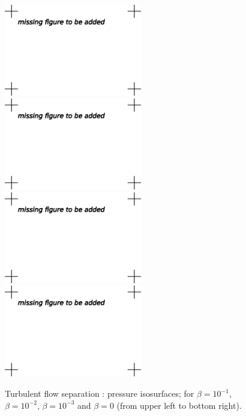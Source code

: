 \begin{figure}
\centering
\includegraphics[height=4cm]{chapters/hoffman-1/eps/Hoffman_fig3a.eps}
\includegraphics[height=4cm]{chapters/hoffman-1/eps/Hoffman_fig3b.eps}
\includegraphics[height=4cm]{chapters/hoffman-1/eps/Hoffman_fig3c.eps}
\includegraphics[height=4cm]{chapters/hoffman-1/eps/Hoffman_fig3d.eps}
\caption{Turbulent flow separation \cite{JanssonHoffman2009}: pressure isosurfaces; for $\beta = 10^{-1}$, $\beta = 10^{-2}$, $\beta = 10^{-3}$ and $\beta = 0$ (from upper left to bottom right).}
\label{fig:2}
\end{figure}

